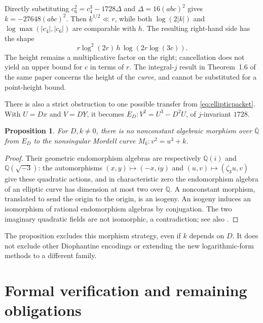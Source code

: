 \documentclass[11pt]{amsart}
\newtheorem{proposition}[theorem]{Proposition}
\theoremstyle{definition}
\theoremstyle{remark}
\newcommand{\Q}{\mathbb Q}
\begin{document}
Directly substituting $c_6^2=c_4^3-1728\Delta$ and
$\Delta=16(abc)^2$ gives $k=-27648(abc)^2$.
Then $\underline{k}^{1/2}\ll r$, while both
$\log(2|k|)$ and $\log\max(|c_4|,|c_6|)$ are comparable with $h$.
The resulting right-hand side has the shape
\[
 r\log^2(2r)\,h\,\log(2r\log(3c)).
\]
The height remains a multiplicative factor on the right; cancellation
does not yield an upper bound for $c$ in terms of $r$.
The integral-$j$ result in Theorem~1.6 of the same paper concerns the
height of the \emph{curve}, and cannot be substituted for a point-height bound.

There is also a strict obstruction to one possible transfer from
\eqref{eq:ellipticpacket}. With $U=Dx$ and $V=DY$, it becomes
$E_D:V^2=U^3-D^2U$, of $j$-invariant $1728$.

\begin{proposition}\label{prop:cm}
For $D,k\ne0$, there is no nonconstant algebraic morphism over
$\overline{\Q}$ from $E_D$ to the nonsingular Mordell curve
$M_k:v^2=u^3+k$.
\end{proposition}
\begin{proof}
Their geometric endomorphism algebras are respectively $\Q(i)$ and
$\Q(\sqrt{-3})$: the automorphisms
$(x,y)\mapsto(-x,iy)$ and $(u,v)\mapsto(\zeta_3u,v)$ give these
quadratic actions, and in characteristic zero the endomorphism algebra
of an elliptic curve has dimension at most two over $\Q$.
A nonconstant morphism, translated to send the origin to the origin,
is an isogeny. An isogeny induces an isomorphism of rational endomorphism
algebras by conjugation. The two imaginary quadratic fields are not
isomorphic, a contradiction; see also \cite[Chapters III and VI]{Silverman}.
\end{proof}

The proposition excludes this morphism strategy, even if $k$ depends on
$D$. It does not exclude other Diophantine encodings or extending the new
logarithmic-form methods to a different family.

\section{Formal verification and remaining obligations}\label{sec:formal}
\end{document}

